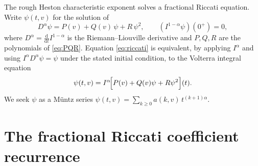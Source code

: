 \documentclass[11pt]{article}
\newcommand{\dd}{\mathrm{d}}
\theoremstyle{plain}
\theoremstyle{definition}
\theoremstyle{remark}
\begin{document}
The rough Heston characteristic exponent solves a fractional Riccati equation.
Write $\psi(t,v)$ for the solution of
\begin{equation}\label{eq:riccati}
   D^\alpha \psi = P(v)+Q(v)\,\psi + R\,\psi^2,\qquad
   (I^{1-\alpha}\psi)(0^+)=0,
\end{equation}
where $D^\alpha=\frac{\dd}{\dd t}I^{1-\alpha}$ is the Riemann--Liouville
derivative and $P,Q,R$ are the polynomials of \eqref{eq:PQR}. Equation
\eqref{eq:riccati} is equivalent, by applying $I^\alpha$ and using
$I^\alpha D^\alpha\psi=\psi$ under the stated initial condition, to the
Volterra integral equation
\begin{equation}\label{eq:volterra}
   \psi(t,v)=I^\alpha\!\Bigl[P(v)+Q(v)\psi+R\psi^2\Bigr](t).
\end{equation}
We seek $\psi$ as a Müntz series $\psi(t,v)=\sum_{k\ge0}a(k,v)\,t^{(k+1)\alpha}$.

\section{The fractional Riccati coefficient recurrence}
\label{sec:riccati}
\end{document}
